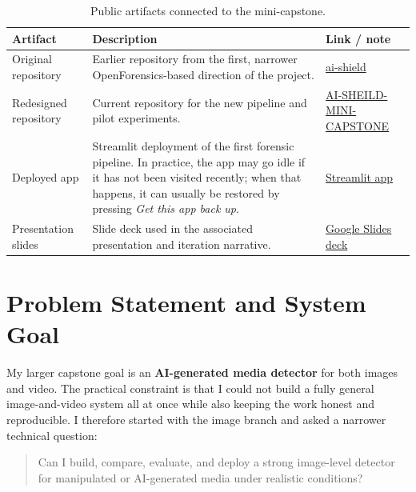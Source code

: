 \documentclass[11pt]{article}
\begin{document}
\begin{table}[H]
\centering
\small
\begin{tabularx}{0.98\textwidth}{>{\raggedright\arraybackslash}p{2.4cm} >{\raggedright\arraybackslash}X >{\raggedright\arraybackslash}p{3.0cm}}
\toprule
\textbf{Artifact} & \textbf{Description} & \textbf{Link / note} \\
\midrule
Original repository & Earlier repository from the first, narrower OpenForensics-based direction of the project. & \href{https://github.com/Abdulrahmansoliman/ai-shield}{ai-shield} \\
Redesigned repository & Current repository for the new pipeline and pilot experiments. & \href{https://github.com/Abdulrahmansoliman/AI-SHEILD-MINI-CAPSTONE}{AI-SHEILD-MINI-CAPSTONE} \\
Deployed app & Streamlit deployment of the first forensic pipeline. In practice, the app may go idle if it has not been visited recently; when that happens, it can usually be restored by pressing \emph{Get this app back up}. & \href{https://ai-sheild-mini-capstone-pw2je37vtmqkydkyb3ae8f.streamlit.app/}{Streamlit app} \\
Presentation slides & Slide deck used in the associated presentation and iteration narrative. & \href{https://docs.google.com/presentation/d/1khocynV_Mvl0LBF9GB6kxojg8uE0ey2k1qvOWHNN4Wk/edit?slide=id.p11\#slide=id.p11}{Google Slides deck} \\
\bottomrule
\end{tabularx}
\caption{Public artifacts connected to the mini-capstone.}
\end{table}

\section{Problem Statement and System Goal}

My larger capstone goal is an \textbf{AI-generated media detector} for both images and video. The practical constraint is that I could not build a fully general image-and-video system all at once while also keeping the work honest and reproducible. I therefore started with the image branch and asked a narrower technical question:

\begin{quote}
Can I build, compare, evaluate, and deploy a strong image-level detector for manipulated or AI-generated media under realistic conditions?
\end{quote}
\end{document}

